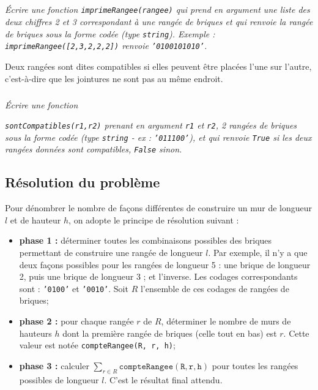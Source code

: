 

\subparagraph{}\textit{\'Ecrire une fonction \texttt{imprimeRangee(rangee)} qui prend en argument une liste des deux chiffres 2 et 3 correspondant à une rangée de briques et qui renvoie la rangée de briques sous la forme codée (type \texttt{string}). Exemple : \texttt{imprimeRangee([2,3,2,2,2])} renvoie \texttt{'0100101010'}.}




Deux rangées sont dites compatibles si elles peuvent être placées l'une sur l'autre, c'est-à-dire que les jointures ne sont pas au même endroit.

\subparagraph{}\textit{\'Ecrire une fonction}

\textit{ \texttt{sontCompatibles(r1,r2)} prenant en argument \texttt{r1} et \texttt{r2}, 2 rangées de briques sous la forme codée (type \texttt{string} - ex : \texttt{'011100'}), et qui renvoie \texttt{True} si les deux rangées données sont compatibles, \texttt{False} sinon.}





\subsection*{Résolution du problème}
\label{sec:resolution}



Pour dénombrer le nombre de façons différentes de construire un mur de longueur $l$ et de hauteur $h$, on adopte le principe de résolution suivant :
\begin{itemize}
\item \textbf{phase 1 :} déterminer toutes les combinaisons possibles des briques permettant de construire une rangée de longueur $l$. Par exemple, il n'y a que deux façons possibles pour les rangées de longueur 5 : une brique de longueur 2, puis une brique de longueur 3 ; et l'inverse. Les codages correspondants sont : \texttt{'0100'} et \texttt{'0010'}. Soit $R$ l'ensemble de ces codages de rangées de briques;
\item \textbf{phase 2 :} pour chaque rangée $r$ de $R$, déterminer le nombre de murs de hauteurs $h$ dont la première rangée de briques (celle tout en bas) est $r$. Cette valeur est notée \texttt{compteRangee(R, r, h)};
\item \textbf{phase 3 :} calculer $\sum \limits_{r \in R} \mathtt{compteRangee(R,r,h)}$ pour toutes les rangées possibles de longueur $l$. C'est le résultat final attendu.
\end{itemize}


